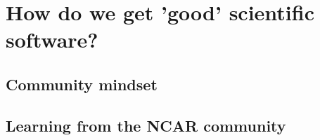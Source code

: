 \documentclass[usenames,dvipsnames]{beamer}
\theoremstyle{plain}
\theoremstyle{definition}
\begin{document}
\section{How do we get 'good' scientific software?}
\subsection{Community mindset}


\begin{frame}{\setframetitle{}}

 \begin{figure}
         {}
 \end{figure}

\end{frame}




\begin{frame}{\setframetitle{}}

 \begin{figure}
         {}
 \end{figure}

\end{frame}






\subsection{Learning from the  NCAR community }


\begin{frame}{\setframetitle{}}

 \begin{figure}
         {}
 \end{figure}

\end{frame}
\end{document}
